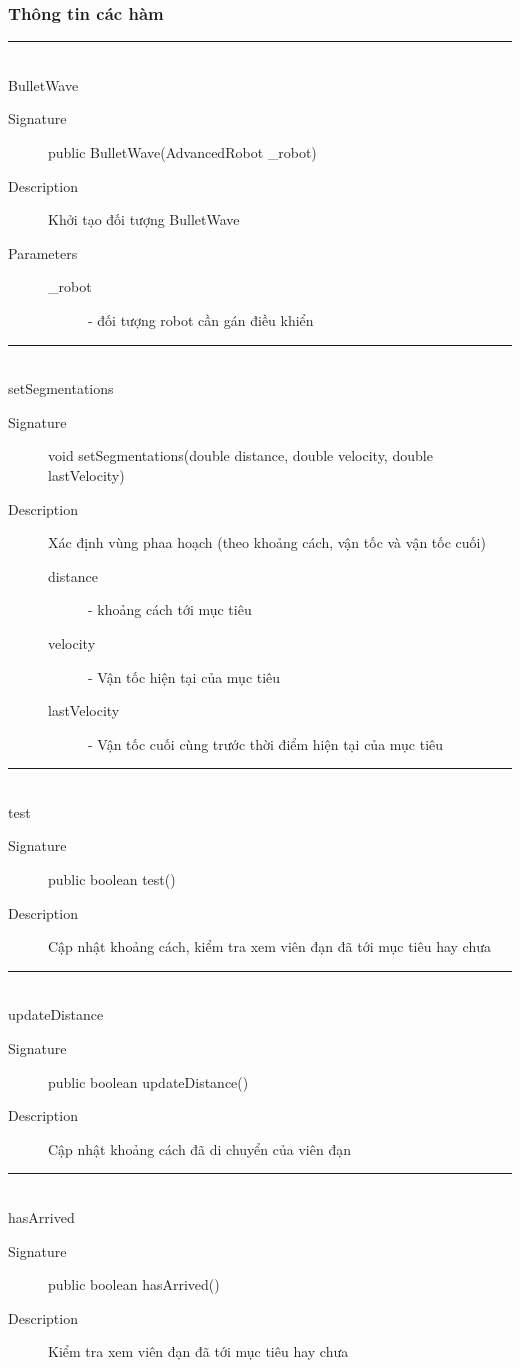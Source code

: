 \documentclass[14pt]{article}
\newcommand{\sep}{\rule{\textwidth}{0.007pt}\\}
\begin{document}
\subsubsection{Thông tin các hàm}
\sep
BulletWave
	\begin{description}
		\item[Signature] public BulletWave(AdvancedRobot \_robot)
		\item[Description] Khởi tạo đối tượng BulletWave
		\item[Parameters]
		\begin{description}
				\item[\_robot] - đối tượng robot cần gán điều khiển
			\end{description}
		\end{description}
\sep
setSegmentations
	\begin{description}
		\item[Signature]void setSegmentations(double distance, double velocity, double lastVelocity)
		\item[Description]Xác định vùng phaa hoạch (theo khoảng cách, vận tốc và vận tốc cuối)
		\begin{description}
				\item[distance] - khoảng cách tới mục tiêu
				\item[velocity] - Vận tốc hiện tại của mục tiêu
				\item[lastVelocity] - Vận tốc cuối cùng trước thời điểm hiện tại của mục tiêu
			\end{description}
	\end{description}		
\sep
test
	\begin{description}
		\item[Signature]public boolean test()
		\item[Description] Cập nhật khoảng cách, kiểm tra xem viên đạn đã tới mục tiêu hay chưa
	\end{description}		
\sep
updateDistance
	\begin{description}
		\item[Signature]public boolean updateDistance()
		\item[Description] Cập nhật khoảng cách đã di chuyển của viên đạn
	\end{description}		
\sep
hasArrived
	\begin{description}
		\item[Signature]public boolean hasArrived()
		\item[Description] Kiểm tra xem viên đạn đã tới mục tiêu hay chưa
	\end{description}		
\end{document}
